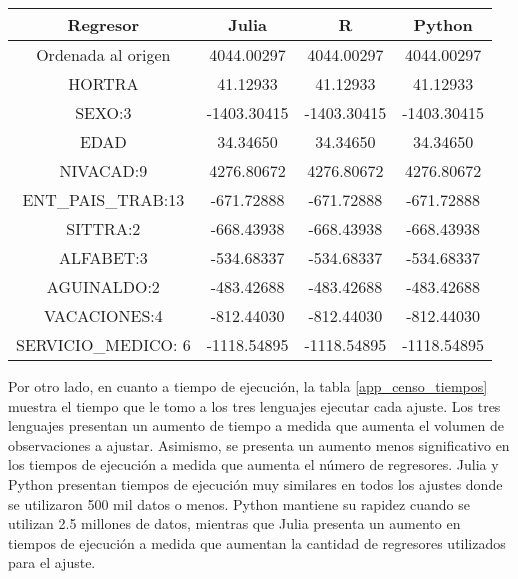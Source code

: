 \begin{center}
	\begin{tabular}{|c|c|c|c|} 
		\hline
		Regresor & Julia & R  & Python  \\ 
		\hline 
		Ordenada al origen & 4044.00297 & 4044.00297 & 4044.00297 \\ 
		
		HORTRA & 41.12933 & 41.12933 & 41.12933 \\
		
		SEXO:3 & -1403.30415 & -1403.30415 & -1403.30415 \\ 
		
		EDAD & 34.34650 & 34.34650 & 34.34650 \\ 
		
		NIVACAD:9 & 4276.80672 & 4276.80672 & 4276.80672 \\
		
		ENT\_PAIS\_TRAB:13 & -671.72888 & -671.72888 & -671.72888 \\
		
		SITTRA:2 & -668.43938 & -668.43938 & -668.43938 \\
		
		ALFABET:3 & -534.68337 & -534.68337 & -534.68337 \\
		
		AGUINALDO:2 & -483.42688 & -483.42688 & -483.42688 \\
		
		VACACIONES:4 & -812.44030 & -812.44030 & -812.44030 \\
		
		SERVICIO\_MEDICO: 6 & -1118.54895 & -1118.54895 & -1118.54895 \\
		
		\hline
	\end{tabular} 
	 \label{comparacion_precision}
\end{center}

Por otro lado, en cuanto a tiempo de ejecución, la tabla \ref{app_censo_tiempos} muestra el tiempo que le tomo a los tres lenguajes ejecutar cada ajuste. Los tres lenguajes presentan un aumento de tiempo a medida que aumenta el volumen de observaciones a ajustar. Asimismo, se presenta un aumento menos significativo en los tiempos de ejecución a medida que aumenta el número de regresores. \textsf{Julia} y \textsf{Python} presentan tiempos de ejecución muy similares en todos los ajustes donde se utilizaron 500 mil datos o menos. \textsf{Python} mantiene su rapidez cuando se utilizan 2.5 millones de datos, mientras que \textsf{Julia} presenta un aumento en tiempos de ejecución a medida que aumentan la cantidad de regresores utilizados para el ajuste. 

